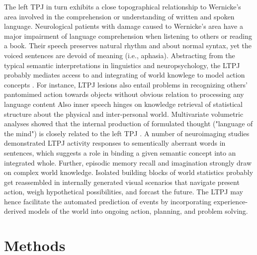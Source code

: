 \documentclass{article} %
\begin{document}
The left TPJ in turn exhibits a close topographical relationship to
Wernicke's area
involved in the comprehension or understanding of written and spoken language.
Neurological patients with damage caused to Wernicke's area
have a major impairment of language comprehension
when listening to others or reading a book.
Their speech
preserves natural rhythm and about normal syntax, yet the
voiced sentences are devoid of meaning (i.e., aphasia).
Abstracting from the typical semantic interpretations in linguistics
and neuropsychology,
the LTPJ probably mediates access to and integrating of world knowlege
to model action concepts
\citep{binder2011neurobiology, seghier2013angular}.
For instance, LTPJ lesions also entail problems in recognizing
others' pantomimed action towards objects
without obvious relation to processing any language content
\citep{varney1987locus}
%
Also inner speech hinges on knowledge retrieval of statistical structure
about the physical and inter-personal world.
Multivariate volumetric analyses showed that the internal production of
formulated thought ("language of the mind") is closely related to the left TPJ
\citep{geva2011neural}.
A number of neuroimaging studies demonstrated LTPJ activity responses
to sementically aberrant words in sentences, which suggests a role
in binding a given semantic concept into an integrated whole.
Further,
episodic memory recall and imagination strongly draw on
complex world knowledge.
Isolated building blocks of world statistics probably get reassembled
in internally generated visual scenarios that
navigate present action, weigh hypothetical possibilities, and forcast the future.
%
The LTPJ may hence facilitate the automated prediction of events
by incorporating experience-derived models of the world
into ongoing action, planning, and problem solving.


\section{Methods}
\end{document}

